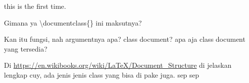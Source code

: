 \documentclass{article}
\begin{document}
this is the first time.

Gimana ya \textbackslash documentclass\{\} ini maksutnya?

Kan itu fungsi, nah argumentnya apa? class document? apa aja class document
yang tersedia?

Di \url{https://en.wikibooks.org/wiki/LaTeX/Document_Structure} di jelaskan lengkap cuy, ada jenis jenis class yang bisa di pake juga. sep sep
\end{document}
